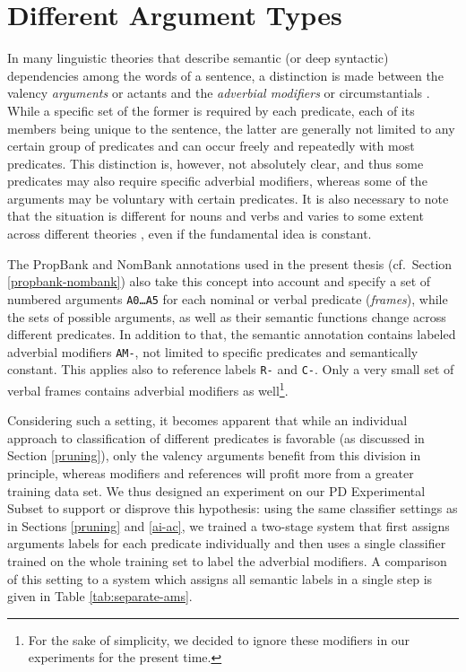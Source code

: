 \documentclass[12pt,notitlepage,a4paper]{report}
\begin{document}
\section{Different Argument Types}\label{arg-types}

In many linguistic theories that describe semantic (or deep syntactic) dependencies among the words of a sentence, a distinction is made between the valency \emph{arguments} or actants and the \emph{adverbial modifiers} or circumstantials \citep[p.~100ff.]{sgall86}. While a specific set of the former is required by each predicate, each of its members being unique to the sentence, the latter are generally not limited to any certain group of predicates and can occur freely and repeatedly with most predicates. This distinction is, however, not absolutely clear, and thus some predicates may also require specific adverbial modifiers, whereas some of the arguments may be voluntary with certain predicates. It is also necessary to note that the situation is different for nouns and verbs and varies to some extent across different theories \citep{rambow03}, even if the fundamental idea is constant.

The PropBank \citep{kingsbury02,palmer05} and NomBank \citep{meyers04} annotations used in the present thesis (cf.\ Section \ref{propbank-nombank}) also take this concept into account and specify a set of numbered arguments \texttt{A0\dots A5} for each nominal or verbal predicate (\emph{frames}), while the sets of possible arguments, as well as their semantic functions change across different predicates. In addition to that, the semantic annotation contains labeled adverbial modifiers \texttt{AM-}, not limited to specific predicates and semantically constant. This applies also to reference labels \texttt{R-} and \texttt{C-}. Only a very small set of verbal frames contains adverbial modifiers as well\footnote{For the sake of simplicity, we decided to ignore these modifiers in our experiments for the present time.}.

Considering such a setting, it becomes apparent that while an individual approach to classification of different predicates is favorable (as discussed in Section \ref{pruning}), only the valency arguments benefit from this division in principle, whereas modifiers and references will profit more from a greater training data set. We thus designed an experiment on our PD Experimental Subset to support or disprove this hypothesis: using the same classifier settings as in Sections \ref{pruning} and \ref{ai-ac}, we trained a two-stage system that first assigns arguments labels for each predicate individually and then uses a single classifier trained on the whole training set to label the adverbial modifiers. A comparison of this setting to a system which assigns all semantic labels in a single step is given in Table \ref{tab:separate-ams}.
\end{document}
